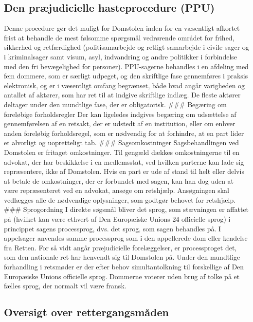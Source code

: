 \documentclass[]{book}
\begin{document}
\hypertarget{den-prjudicielle-hasteprocedure-ppu}{%
\subsection{Den præjudicielle hasteprocedure (PPU)}\label{den-prjudicielle-hasteprocedure-ppu}}

Denne procedure gør det muligt for Domstolen inden for en væsentligt afkortet frist at behandle de mest følsomme spørgsmål vedrørende området for frihed, sikkerhed og retfærdighed (politisamarbejde og retligt samarbejde i civile sager og i kriminalsager samt visum, asyl, indvandring og andre politikker i forbindelse med den fri bevægelighed for personer). PPU-sagerne behandles i en afdeling med fem dommere, som er særligt udpeget, og den skriftlige fase gennemføres i praksis elektronisk, og er i væsentligt omfang begrænset, både hvad angår varigheden og antallet af aktører, som har ret til at indgive skriftlige indlæg. De fleste aktører deltager under den mundtlige fase, der er obligatorisk.
\#\#\# Begæring om foreløbige forholdsregler
Der kan ligeledes indgives begæring om udsættelse af gennemførelsen af en retsakt, der er udstedt af en institution, eller om enhver anden foreløbig forholdsregel, som er nødvendig for at forhindre, at en part lider et alvorligt og uopretteligt tab.
\#\#\# Sagsomkostninger
Sagsbehandlingen ved Domstolen er fritaget omkostninger. Til gengæld dækkes omkostningerne til en advokat, der har beskikkelse i en medlemsstat, ved hvilken parterne kan lade sig repræsentere, ikke af Domstolen. Hvis en part er ude af stand til helt eller delvis at betale de omkostninger, der er forbundet med sagen, kan han dog uden at være repræsenteret ved en advokat, ansøge om retshjælp. Ansøgningen skal vedlægges alle de nødvendige oplysninger, som godtgør behovet for retshjælp.
\#\#\# Sprogordning
I direkte søgsmål bliver det sprog, som stævningen er affattet på (hvilket kan være ethvert af Den Europæiske Unions 24 officielle sprog) i princippet sagens processprog, dvs. det sprog, som sagen behandles på. I appelsager anvendes samme processprog som i den appellerede dom eller kendelse fra Retten. For så vidt angår præjudicielle forelæggelser, er processproget det, som den nationale ret har henvendt sig til Domstolen på. Under den mundtlige forhandling i retsmøder er der efter behov simultantolkning til forskellige af Den Europæiske Unions officielle sprog. Dommerne voterer uden brug af tolke på et fælles sprog, der normalt vil være fransk.

\hypertarget{oversigt-over-rettergangsmaden}{%
\subsection{Oversigt over rettergangsmåden}\label{oversigt-over-rettergangsmaden}}
\end{document}

